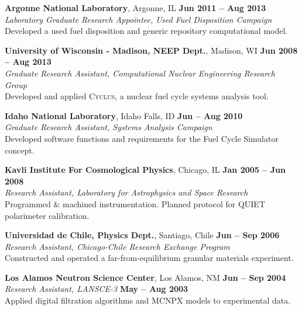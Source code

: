 \documentclass[margin,line]{resume}
\newcommand{\Cyclus}{\textsc{Cyclus}\xspace}%
\begin{document}
\begin{resume}
    \textbf{Argonne National Laboratory}, Argonne, IL \hfill \textbf{Jun 2011 -- Aug 2013}\\
		\textsl{Laboratory Graduate Research Appointee, Used Fuel Disposition Campaign}\\
		Developed a used fuel disposition and generic repository computational model.

    \textbf{University of Wisconsin - Madison, NEEP Dept.}, Madison, WI \hfill \textbf{Jun 2008 -- Aug 2013}\\
		\textsl{Graduate Research Assistant, Computational Nuclear Engineering Research Group}\\
		Developed and applied \Cyclus, a nuclear fuel cycle systems analysis tool.

    \textbf{Idaho National Laboratory}, Idaho Falls, ID \hfill \textbf{Jun -- Aug 2010}\\
		\textsl{Graduate Research Assistant, Systems Analysis Campaign}\\
		Developed software functions and requirements for the Fuel Cycle Simulator concept.

    \textbf{Kavli Institute For Cosmological Physics}, Chicago, IL \hfill \textbf{Jan 2005 -- Jun 2008}\\
                \textsl{Research Assistant, Laboratory for Astrophysics and Space Research}\\
                Programmed \& machined instrumentation. Planned protocol for QUIET polarimeter calibration.

    \textbf{Universidad de Chile, Physics Dept.}, Santiago, Chile \hfill \textbf{Jun -- Sep 2006}\\
                \textsl{Research Assistant, Chicago-Chile Research Exchange Program}\\
                 Constructed and operated a far-from-equilibrium granular 
                 materials experiment.

    \textbf{Los Alamos Neutron Science Center}, Los Alamos, NM \hfill \textbf{Jun -- Sep 2004}\\
                \textsl{Research Assistant, LANSCE-3} \hfill \textbf{May -- Aug 2003}\\
                Applied digital filtration algorithms and MCNPX models to experimental data.

\end{resume}
\end{document}
